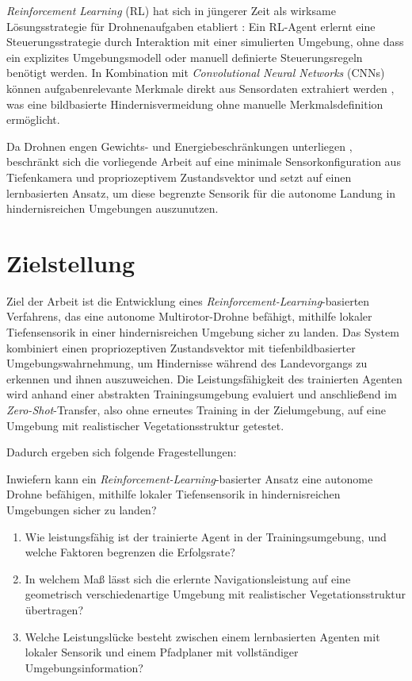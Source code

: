 \textit{Reinforcement Learning} (RL) hat sich in jüngerer Zeit als wirksame Lösungsstrategie für Drohnenaufgaben etabliert \autocite{kaufmannChampionlevelDroneRacing2023, hodgeDeepReinforcementLearning2021, amendolaDroneLandingReinforcement2024}: Ein RL-Agent erlernt eine Steuerungsstrategie durch Interaktion mit einer simulierten Umgebung, ohne dass ein explizites Umgebungsmodell oder manuell definierte Steuerungsregeln benötigt werden. In Kombination mit \textit{Convolutional Neural Networks} (CNNs) können aufgabenrelevante Merkmale direkt aus Sensordaten extrahiert werden \autocite{mnihHumanlevelControlDeep2015}, was eine bildbasierte Hindernisvermeidung ohne manuelle Merkmalsdefinition ermöglicht.

Da Drohnen engen Gewichts- und Energiebeschränkungen unterliegen \autocite{semerikovVisionBasedAutonomousUAV2025}, beschränkt sich die vorliegende Arbeit auf eine minimale Sensorkonfiguration aus Tiefenkamera und propriozeptivem Zustandsvektor und setzt auf einen lernbasierten Ansatz, um diese begrenzte Sensorik für die autonome Landung in hindernisreichen Umgebungen auszunutzen.

\section{Zielstellung}

Ziel der Arbeit ist die Entwicklung eines \textit{Reinforcement-Learning}-basierten Verfahrens, das eine autonome Multirotor-Drohne befähigt, mithilfe lokaler Tiefensensorik in einer hindernisreichen Umgebung sicher zu landen. Das System kombiniert einen propriozeptiven Zustandsvektor mit tiefenbildbasierter Umgebungswahrnehmung, um Hindernisse während des Landevorgangs zu erkennen und ihnen auszuweichen. Die Leistungsfähigkeit des trainierten Agenten wird anhand einer abstrakten Trainingsumgebung evaluiert und anschließend im \textit{Zero-Shot}-Transfer, also ohne erneutes Training in der Zielumgebung, auf eine Umgebung mit realistischer Vegetationsstruktur getestet.

Dadurch ergeben sich folgende Fragestellungen:

Inwiefern kann ein \textit{Reinforcement-Learning}-basierter Ansatz eine autonome Drohne befähigen, mithilfe lokaler Tiefensensorik in hindernisreichen Umgebungen sicher zu landen?

\begin{enumerate}
	\item Wie leistungsfähig ist der trainierte Agent in der Trainingsumgebung, und welche Faktoren begrenzen die Erfolgsrate?
	\item In welchem Maß lässt sich die erlernte Navigationsleistung auf eine geometrisch verschiedenartige Umgebung mit realistischer Vegetationsstruktur übertragen?
	\item Welche Leistungslücke besteht zwischen einem lernbasierten Agenten mit lokaler Sensorik und einem Pfadplaner mit vollständiger Umgebungsinformation?
\end{enumerate}

